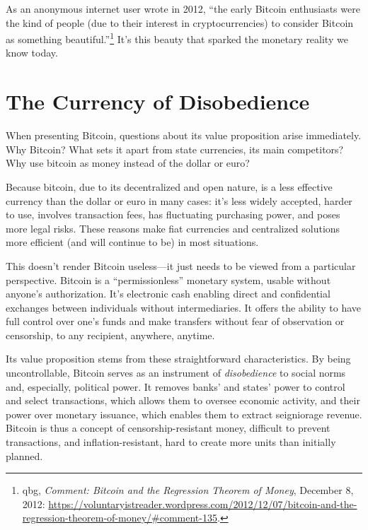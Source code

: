 \documentclass[
  a5paper,
  smalldemyvopaper,10pt,twoside,onecolumn,openright,extrafontsizes,hidelinks]{memoir}
\begin{document}
As an anonymous internet user wrote in 2012, ``the early Bitcoin
enthusiasts were the kind of people (due to their interest in
cryptocurrencies) to consider Bitcoin as something
beautiful.''\footnote{qbg, \emph{Comment: Bitcoin and the Regression
  Theorem of Money}, December 8, 2012:
  \url{https://voluntaryistreader.wordpress.com/2012/12/07/bitcoin-and-the-regression-theorem-of-money/\#comment-135}.}
It's this beauty that sparked the monetary reality we know today.

\section*{The Currency of
Disobedience}\label{la-monnaie-de-la-desobeissance}


When presenting Bitcoin, questions about its value proposition arise
immediately. Why Bitcoin? What sets it apart from state currencies, its
main competitors? Why use bitcoin as money instead of the dollar or
euro?

Because bitcoin, due to its decentralized and open nature, is a less
effective currency than the dollar or euro in many cases: it's less
widely accepted, harder to use, involves transaction fees, has
fluctuating purchasing power, and poses more legal risks. These reasons
make fiat currencies and centralized solutions more efficient (and will
continue to be) in most situations.

This doesn't render Bitcoin useless---it just needs to be viewed from a
particular perspective. Bitcoin is a ``permissionless'' monetary system,
usable without anyone's authorization. It's electronic cash enabling
direct and confidential exchanges between individuals without
intermediaries. It offers the ability to have full control over one's
funds and make transfers without fear of observation or censorship, to
any recipient, anywhere, anytime.

Its value proposition stems from these straightforward characteristics.
By being uncontrollable, Bitcoin serves as an instrument of
\emph{disobedience} to social norms and, especially, political power. It
removes banks' and states' power to control and select transactions,
which allows them to oversee economic activity, and their power over
monetary issuance, which enables them to extract seigniorage revenue.
Bitcoin is thus a concept of censorship-resistant money, difficult to
prevent transactions, and inflation-resistant, hard to create more units
than initially planned.
\end{document}
